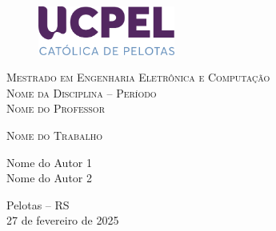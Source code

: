 \thispagestyle{empty}
\begin{titlingpage}

\begin{figure}[!h]
        \centering
	\vspace{-1cm}
	\includegraphics[width=0.4\textwidth]{img/logo_UCPEL_SECUNDARIO.pdf}
	\vspace{-1cm}
\end{figure}

\begin{center}\large
    \textsc{Mestrado em Engenharia Eletrônica e Computação}\\
    \textsc{Nome da Disciplina -- Período}\\
    \textsc{Nome do Professor}
    
    \vspace{4.5cm}
    
    
    \vspace{1cm}
   
    {\Huge \textsc{Nome do Trabalho}}
    
    \vspace{4cm}
    
    Nome do Autor 1 \\
    Nome do Autor 2 
    
    \vfill

    \normalsize{Pelotas -- RS\\27 de fevereiro de 2025}

\end{center}

\end{titlingpage}


